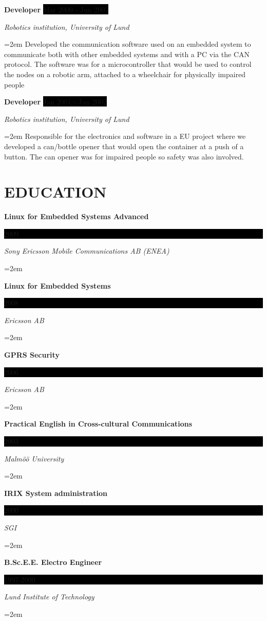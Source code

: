 \documentclass[paper=a4,fontsize=11pt]{scrartcl}
\newcommand{\sepspace}{\vspace*{1em}}
\newcommand{\NewPart}[1]{\section*{\uppercase{#1}}}
\newcommand{\EducationEntry}[4]{
		\noindent \textbf{#1} \hfill 					%
		\colorbox{Black}{%
			\parbox{6em}{%
			\hfill\color{White}#2}} \par				%
		\noindent \textit{#3} \par					%
		\noindent\hangindent=2em\hangafter=0 \small #4 	%
		\normalsize \par}
\newcommand{\WorkEntry}[4]{						%
		\noindent \textbf{#1} \hfill 					%
		\colorbox{Black}{\color{White}#2} \par		%
		\noindent \textit{#3} \par					%
		\noindent\hangindent=2em\hangafter=0 \small #4 	%
		\normalsize \par}
\begin{document}
\WorkEntry{Developer}{Mar 2000 - Jun 2003}{Robotics institution, University of Lund}		
{Developed the communication software used on an embedded system to communicate both with other  embedded systems and with a PC via the CAN protocol.
  The software was for a microcontroller that would be used to control the nodes on a robotic arm, attached to a wheelchair for
physically impaired people} 
\sepspace

\WorkEntry{Developer}{Jan 2001 - Jun 2002}{Robotics institution, University of Lund}		
{Responsible for the electronics and software in a EU project where we developed a can/bottle opener that would open the container at a push of a button. 
The can opener was for impaired people so safety was also involved.} %


\NewPart{Education}{}

\EducationEntry {Linux for Embedded Systems Advanced}{2009}{Sony Ericsson Mobile Communications AB (ENEA)}
{}	
\sepspace

\EducationEntry {Linux for Embedded Systems}{2008}{Ericsson AB}
{}	
\sepspace

\EducationEntry {GPRS Security}{2006}{Ericsson AB}
{}	
\sepspace

\EducationEntry{Practical English in Cross-cultural Communications}{2003}{Malm\"{o}ö University}
{}
\sepspace

\EducationEntry {IRIX System administration}{2000}{SGI}
{}	
\sepspace

\EducationEntry{B.Sc.E.E. Electro Engineer}{1997-2000}{Lund Institute of Technology} {}
\end{document}
